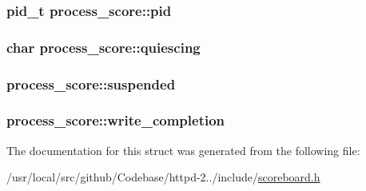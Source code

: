 \subsubsection[{\texorpdfstring{pid}{pid}}]{\setlength{\rightskip}{0pt plus 5cm}pid\+\_\+t process\+\_\+score\+::pid}\hypertarget{structprocess__score_a77fe9c1f37296cd514a1592800848be0}{}\label{structprocess__score_a77fe9c1f37296cd514a1592800848be0}
\subsubsection[{\texorpdfstring{quiescing}{quiescing}}]{\setlength{\rightskip}{0pt plus 5cm}char process\+\_\+score\+::quiescing}\hypertarget{structprocess__score_ad6990194283e5d8fe862bc2becd6d99d}{}\label{structprocess__score_ad6990194283e5d8fe862bc2becd6d99d}
\subsubsection[{\texorpdfstring{suspended}{suspended}}]{ process\+\_\+score\+::suspended}\hypertarget{structprocess__score_aba28bce0b671e908af341f1fe92c7b34}{}\label{structprocess__score_aba28bce0b671e908af341f1fe92c7b34}
\subsubsection[{\texorpdfstring{write\+\_\+completion}{write_completion}}]{ process\+\_\+score\+::write\+\_\+completion}\hypertarget{structprocess__score_a28b44684e2eb96db7f2a1bd739952e82}{}\label{structprocess__score_a28b44684e2eb96db7f2a1bd739952e82}


The documentation for this struct was generated from the following file\+:\begin{DoxyCompactItemize}
\item 
/usr/local/src/github/\+Codebase/httpd-\/2../include/\hyperlink{scoreboard_8h}{scoreboard.\+h}\end{DoxyCompactItemize}
